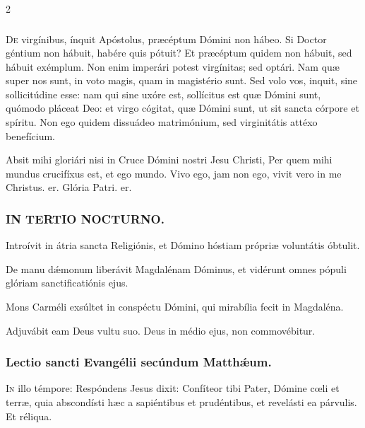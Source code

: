 \documentclass[9pt,twoside]{extarticle}
\begin{document}
\begin{multicols}{2}
\subsubsection*{\center {}}
\lettrine{D}e virgínibus, ínquit Apóstolus, præcéptum Dómini non hábeo. Si Doctor géntium non hábuit, habére quis pótuit? Et præcéptum quidem non hábuit, sed hábuit exémplum. Non enim imperári potest virgínitas; sed optári. Nam quæ super nos sunt, in voto magis, quam in magistério sunt. Sed volo vos, inquit, sine sollicitúdine esse: nam qui sine uxóre est, sollícitus est quæ Dómini sunt, quómodo pláceat Deo: et virgo cógitat, quæ Dómini sunt, ut sit sancta córpore et spíritu. Non ego quidem dissuádeo matrimónium, sed virginitátis attéxo benefícium.

\begin{tightlist}{}
\item {} Absit mihi gloriári nisi in Cruce Dómini nostri Jesu Christi, \textred{*} Per quem mihi mundus crucifíxus est, et ego mundo.  Vivo ego, jam non ego, vivit vero in me Christus. er. Glória Patri. er.
\end{tightlist}

\subsubsection*{\center \textsc{IN TERTIO NOCTURNO.}}
\begin{tightlist}{}
\item {} Introívit in átria sancta Religiónis, et Dómino hóstiam própriæ voluntátis óbtulit.
\item {} De manu dǽmonum liberávit Magdalénam Dóminus, et vidérunt omnes pópuli glóriam sanctificatiónis ejus.
\item {} Mons Carméli exsúltet in conspéctu Dómini, qui mirabília fecit in Magdaléna.
\item {} Adjuvábit eam Deus vultu suo.  Deus in médio ejus, non commovébitur.
\end{tightlist}

\subsubsection*{\center Lectio sancti Evangélii secúndum Matthǽum.}
\begin{center}\end{center}
\lettrine{I}n illo témpore: Respóndens Jesus dixit: Confíteor tibi Pater, Dómine cœli et terræ, quia abscondísti hæc a sapiéntibus et prudéntibus, et revelásti ea párvulis. Et réliqua.


\end{multicols}
\end{document}

